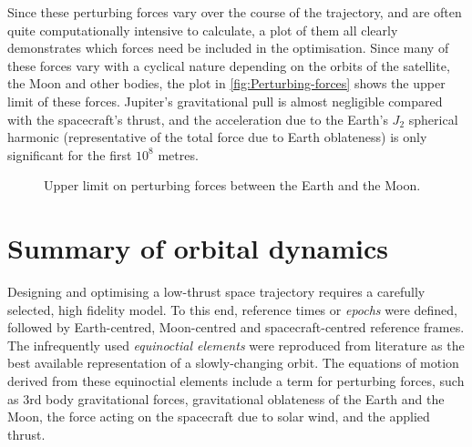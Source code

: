 Since these perturbing forces vary over the course of the trajectory, and are often quite computationally intensive to calculate, a plot of them all clearly demonstrates which forces need be included in the optimisation. Since many of these forces vary with a cyclical nature depending on the orbits of the satellite, the Moon and other bodies, the plot in \autoref{fig:Perturbing-forces} shows the upper limit of these forces. Jupiter's gravitational pull is almost negligible compared with the spacecraft's thrust, and the acceleration due to the Earth's $J_{2}$ spherical harmonic (representative of the total force due to Earth oblateness) is only significant for the first $10^{8}$ metres.

\begin{figure}[h]
\centering
\def\svgwidth{\figurewidth}

\caption{Upper limit on perturbing forces between the Earth and the Moon.} \label{fig:Perturbing-forces}
\end{figure}




\section{Summary of orbital dynamics} 

Designing and optimising a low-thrust space trajectory requires a carefully selected, high fidelity model. To this end, reference times or \emph{epochs} were defined, followed by Earth-centred, Moon-centred and spacecraft-centred reference frames. The infrequently used \emph{equinoctial elements} were reproduced from literature as the best available representation of a slowly-changing orbit. The equations of motion derived from these equinoctial elements include a term for perturbing forces, such as 3rd body gravitational forces, gravitational oblateness of the Earth and the Moon, the force acting on the spacecraft due to solar wind, and the applied thrust. %